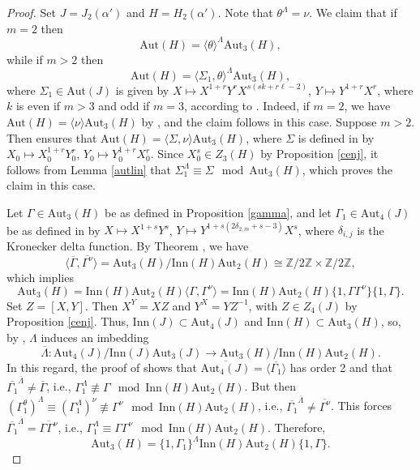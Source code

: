 \documentclass{amsart}
\theoremstyle{definition}
\theoremstyle{remark}
\newcommand \Z{{\mathbb Z}}
\begin{document}
\begin{proof} Set $J=J_2(\alpha')$ and $H=H_2(\alpha')$. Note that $\theta^\Lambda=\nu$. We claim that
if $m=2$ then
\begin{equation}\label{hj0}
\mathrm{Aut}(H)=\langle\theta\rangle^\Lambda \mathrm{Aut}_3(H),
\end{equation}
while if $m>2$ then
\begin{equation}\label{hj1}
\mathrm{Aut}(H)=\langle\Sigma_1,\theta\rangle^\Lambda\mathrm{Aut}_3(H),
\end{equation}
where $\Sigma_1\in \mathrm{Aut}(J)$ is given by $X\mapsto X^{1+r}Y^r X^{s(sk+r\ell-2)}$, $Y\mapsto Y^{1+r}X^r$,
where $k$ is even if $m>3$ and odd if $m=3$, according to \cite[Proposition 7.6]{MS3}.
Indeed, if $m=2$, we have $\mathrm{Aut}(H)=\langle \nu\rangle\mathrm{Aut}_3(H)$ by \cite[Theorem 6.14]{MS3}, and the claim follows
in this case. Suppose  $m>2$. Then \cite[Theorem 6.14]{MS3} ensures that
$\mathrm{Aut}(H)=\langle \Sigma,\nu\rangle\mathrm{Aut}_3(H)$, where
$\Sigma$ is defined in \cite[Corollary 6.12]{MS3} by $X_0\mapsto X_0^{1+r}Y_0^r$, $Y_0\mapsto Y_0^{1+r}X_0^r$.
Since $X_0^s\in Z_3(H)$ by Proposition \ref{cenj}, it follows from Lemma \ref{autlin} that
$\Sigma_1^\Lambda\equiv\Sigma\mod \mathrm{Aut}_3(H)$, which proves the claim in this case.

Let $\Gamma\in \mathrm{Aut}_3(H)$ be as defined in Proposition \ref{gamma},
and let $\Gamma_1\in \mathrm{Aut}_4(J)$ be as defined in \cite[Proposition 7.5]{MS3} by
$X\mapsto X^{1+s}Y^s$, $Y\mapsto Y^{1+s(2\delta_{2,m}+s-3)} X^s$, where $\delta_{i,j}$
is the Kronecker delta function. By Theorem \cite[Theorem 6.10]{MS3}, we have
$$
\langle \overline{\Gamma}, \overline{\Gamma^\nu}\rangle=\mathrm{Aut}_3(H)/\mathrm{Inn}(H)\mathrm{Aut}_2(H)\cong \Z/2\Z\times \Z/2\Z,
$$
which implies
$$
\mathrm{Aut}_3(H)=\mathrm{Inn}(H)\mathrm{Aut}_2(H)\langle \Gamma, \Gamma^\nu\rangle=
\mathrm{Inn}(H)\mathrm{Aut}_2(H)\{1, \Gamma\Gamma^\nu\}\{1, \Gamma\}.
$$
Set $Z=[X,Y]$. Then $X^Y=XZ$ and $Y^X=YZ^{-1}$, with $Z\in Z_4(J)$ by Proposition \ref{cenj}. Thus,
$\mathrm{Inn}(J)\subset\mathrm{Aut}_4(J)$ and $\mathrm{Inn}(H)\subset\mathrm{Aut}_3(H)$, so,
by \cite[Proposition 6.9]{MS3}, $\Lambda$ induces an imbedding
$$
\overline{\Lambda}: \mathrm{Aut}_4(J)/\mathrm{Inn}(J)\mathrm{Aut}_3(J)\to \mathrm{Aut}_3(H)/\mathrm{Inn}(H)\mathrm{Aut}_2(H).
$$
In this regard, the proof of \cite[Theorem 7.7]{MS3} shows that
$\overline{\mathrm{Aut}_4(J)}=\langle \overline{\Gamma_1}\rangle$ has order 2 and that $\overline{\Gamma_1}^{\overline{\Lambda}}\neq
\overline{\Gamma}$, i.e., $\Gamma_1^\Lambda\not\equiv \Gamma\mod \mathrm{Inn}(H)\mathrm{Aut}_2(H)$. But then
$(\Gamma_1^\theta)^\Lambda\equiv(\Gamma_1^\Lambda)^\nu\not\equiv \Gamma^\nu\mod \mathrm{Inn}(H)\mathrm{Aut}_2(H)$, i.e.,
$\overline{\Gamma_1}^{\overline{\Lambda}}\neq \overline{\Gamma^\nu}$. This forces
$\overline{\Gamma_1}^{\overline{\Lambda}}=\overline{\Gamma\Gamma^\nu}$, i.e.,
$\Gamma_1^\Lambda\equiv \Gamma\Gamma^\nu\mod \mathrm{Inn}(H)\mathrm{Aut}_2(H)$. Therefore,
\begin{equation}\label{hj2}
\mathrm{Aut}_3(H)=\{1,\Gamma_1\}^\Lambda \mathrm{Inn}(H)\mathrm{Aut}_2(H)\{1, \Gamma\}.
\end{equation}


\end{proof}
\end{document}
